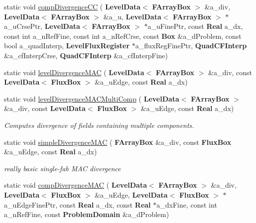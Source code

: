\begin{DoxyCompactItemize}
\item 
static void \hyperlink{class_divergence_ab20b13344306e041cbf99e4234a46244}{comp\+Divergence\+CC} (\textbf{ Level\+Data}$<$ \textbf{ F\+Array\+Box} $>$ \&a\+\_\+div, \textbf{ Level\+Data}$<$ \textbf{ F\+Array\+Box} $>$ \&a\+\_\+u, \textbf{ Level\+Data}$<$ \textbf{ F\+Array\+Box} $>$ $\ast$a\+\_\+u\+Crse\+Ptr, \textbf{ Level\+Data}$<$ \textbf{ F\+Array\+Box} $>$ $\ast$a\+\_\+u\+Fine\+Ptr, const \textbf{ Real} a\+\_\+dx, const int a\+\_\+n\+Ref\+Fine, const int a\+\_\+n\+Ref\+Crse, const \textbf{ Box} \&a\+\_\+d\+Problem, const bool a\+\_\+quad\+Interp, \textbf{ Level\+Flux\+Register} $\ast$a\+\_\+flux\+Reg\+Fine\+Ptr, \textbf{ Quad\+C\+F\+Interp} \&a\+\_\+cf\+Interp\+Crse, \textbf{ Quad\+C\+F\+Interp} \&a\+\_\+cf\+Interp\+Fine)
\item 
static void \hyperlink{class_divergence_a9004d4f62127cfaecab354769b4fcd58}{level\+Divergence\+M\+AC} (\textbf{ Level\+Data}$<$ \textbf{ F\+Array\+Box} $>$ \&a\+\_\+div, const \textbf{ Level\+Data}$<$ \textbf{ Flux\+Box} $>$ \&a\+\_\+u\+Edge, const \textbf{ Real} a\+\_\+dx)
\item 
static void \hyperlink{class_divergence_a6e222e89a13a45cbc06f380302aebf13}{level\+Divergence\+M\+A\+C\+Multi\+Comp} (\textbf{ Level\+Data}$<$ \textbf{ F\+Array\+Box} $>$ \&a\+\_\+div, const \textbf{ Level\+Data}$<$ \textbf{ Flux\+Box} $>$ \&a\+\_\+u\+Edge, const \textbf{ Real} a\+\_\+dx)
\begin{DoxyCompactList}\small\item\em Computes divergence of fields containing multiple components. \end{DoxyCompactList}\item 
\mbox{\label{class_divergence_acc40ffe25f3b5a7eeb35cfab48873180}} 
static void \hyperlink{class_divergence_acc40ffe25f3b5a7eeb35cfab48873180}{simple\+Divergence\+M\+AC} (\textbf{ F\+Array\+Box} \&a\+\_\+div, const \textbf{ Flux\+Box} \&a\+\_\+u\+Edge, const \textbf{ Real} a\+\_\+dx)
\begin{DoxyCompactList}\small\item\em really basic single-\/fab M\+AC divergence \end{DoxyCompactList}\item 
static void \hyperlink{class_divergence_acd62afebbe823676309ba7301578ea96}{comp\+Divergence\+M\+AC} (\textbf{ Level\+Data}$<$ \textbf{ F\+Array\+Box} $>$ \&a\+\_\+div, \textbf{ Level\+Data}$<$ \textbf{ Flux\+Box} $>$ \&a\+\_\+u\+Edge, \textbf{ Level\+Data}$<$ \textbf{ Flux\+Box} $>$ $\ast$a\+\_\+u\+Edge\+Fine\+Ptr, const \textbf{ Real} a\+\_\+dx, const \textbf{ Real} $\ast$a\+\_\+dx\+Fine, const int a\+\_\+n\+Ref\+Fine, const \textbf{ Problem\+Domain} \&a\+\_\+d\+Problem)

\end{DoxyCompactItemize}
